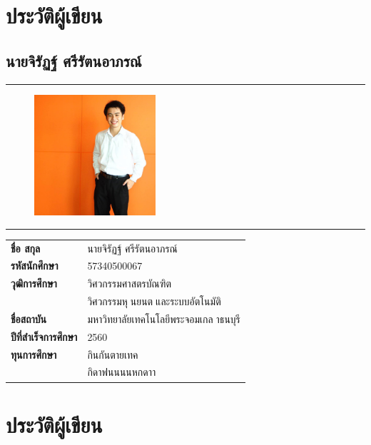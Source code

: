 \clearpage

\chapter*{ประวัติผู้เขียน}
\section*{นายจิรัฏฐ์ ศรีรัตนอาภรณ์}

\hrule height .7pt
\begin{figure}[!ht]
	\centering
	\includegraphics[width=0.4\textwidth]{pages/images/jirad.jpg}
\end{figure}
\hrule height .7pt
\raggedright
\begin{tabular}{p{} p{}}
    \textbf{ชื่อ สกุล} & {นายจิรัฏฐ์ ศรีรัตนอาภรณ์} \\
    \textbf{รหัสนักศึกษา} & {57340500067}\\
    \textbf{วุฒิการศึกษา} & {วิศวกรรมศาสตรบัณฑิต} \\
    {} & {วิศวกรรมหุนยนตและระบบอัตโนมัติ}\\
    \textbf{ชื่อสถาบัน} & {มหาวิทยาลัยเทคโนโลยีพระจอมเกลาธนบุรี} \\
    \textbf{ปีที่สำเร็จการศึกษา} & {2560} \\
    \textbf{ทุนการศึกษา} & {กินกันตายเทค}\\
    {} & {กิดาฟนนนนหกดาา}\\
\end{tabular}   

\chapter*{ประวัติผู้เขียน}

